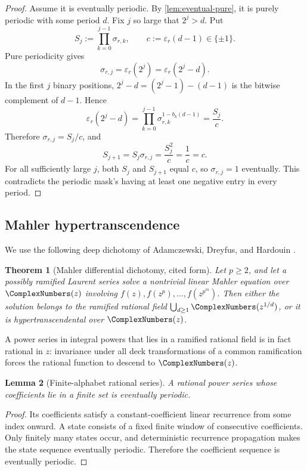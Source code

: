 \documentclass[11pt,oneside]{article}
\newtheorem{theorem}{Theorem}[section]
\newtheorem{lemma}[theorem]{Lemma}
\theoremstyle{definition}
\theoremstyle{remark}
\begin{document}
\begin{proof}
Assume it is eventually periodic.  By \cref{lem:eventual-pure}, it is purely
periodic with some period $d$.  Fix $j$ so large that $2^j>d$.  Put
\[
 S_j:=\prod_{k=0}^{j-1}\sigma_{r,k},\qquad c:=\varepsilon_r(d-1)\in\{\pm1\}.
\]
Pure periodicity gives
\[
 \sigma_{r,j}=\varepsilon_r(2^j)=\varepsilon_r(2^j-d).
\]
In the first $j$ binary positions, $2^j-d=(2^j-1)-(d-1)$ is the bitwise
complement of $d-1$.  Hence
\begin{equation}\label{eq:complement-sign}
 \varepsilon_r(2^j-d)
 =\prod_{k=0}^{j-1}\sigma_{r,k}^{1-b_k(d-1)}
 =\frac{S_j}{c}.
\end{equation}
Therefore $\sigma_{r,j}=S_j/c$, and
\[
 S_{j+1}=S_j\sigma_{r,j}=\frac{S_j^2}{c}=\frac1c=c.
\]
For all sufficiently large $j$, both $S_j$ and $S_{j+1}$ equal $c$, so
$\sigma_{r,j}=1$ eventually.  This contradicts the periodic mask's having at
least one negative entry in every period.
\end{proof}

\subsection{Mahler hypertranscendence}

We use the following deep dichotomy of Adamczewski, Dreyfus, and Hardouin
\cite{adh}.

\begin{theorem}[Mahler differential dichotomy, cited form]\label{thm:ADH}
Let $p\geq2$, and let a possibly ramified Laurent series solve a nontrivial
linear Mahler equation over $\ComplexNumbers(z)$ involving $f(z),f(z^p),\ldots,f(z^{p^m})$.
Then either the solution belongs to the ramified rational field
$\bigcup_{d\geq1}\ComplexNumbers(z^{1/d})$, or it is hypertranscendental over $\ComplexNumbers(z)$.
\end{theorem}

A power series in integral powers that lies in a ramified rational field is in
fact rational in $z$: invariance under all deck transformations of a common
ramification forces the rational function to descend to $\ComplexNumbers(z)$.

\begin{lemma}[Finite-alphabet rational series]\label{lem:finite-rational}
A rational power series whose coefficients lie in a finite set is eventually
periodic.
\end{lemma}

\begin{proof}
Its coefficients satisfy a constant-coefficient linear recurrence from some
index onward.  A state consists of a fixed finite window of consecutive
coefficients.  Only finitely many states occur, and deterministic recurrence
propagation makes the state sequence eventually periodic.  Therefore the
coefficient sequence is eventually periodic.
\end{proof}
\end{document}
